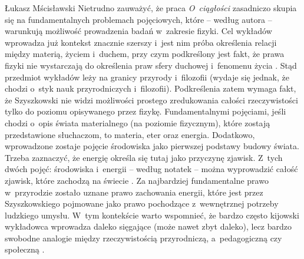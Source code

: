 \begin{artplenv}{Łukasz Mścisławski}
Nietrudno zauważyć, że praca \textit{O~ciągłości} zasadniczo skupia się na fundamentalnych problemach pojęciowych, które -- według autora -- warunkują możliwość prowadzenia badań w~zakresie fizyki. Cel wykładów wprowadza już kontekst znacznie szerszy i~jest nim próba określenia relacji między materią, życiem i~duchem, przy czym podkreślony jest fakt, że prawa fizyki nie wystarczają do określenia praw sfery duchowej i~fenomenu życia
\parencite*[][k. 211r]{noauthor_noty_1917}. %
 Stąd przedmiot wykładów leży na granicy przyrody i~filozofii (wydaje się jednak, że chodzi o~styk nauk przyrodniczych i~filozofii). Podkreślenia zatem wymaga fakt, że Szyszkowski nie widzi możliwości prostego zredukowania całości rzeczywistości tylko do poziomu opisywanego przez fizykę. Fundamentalnymi pojęciami, jeśli chodzi o~opis świata materialnego (na poziomie fizycznym), które zostają przedstawione słuchaczom, to materia, eter oraz energia. Dodatkowo, wprowadzone zostaje pojęcie środowiska jako pierwszej podstawy budowy świata. Trzeba zaznaczyć, że energię określa się tutaj jako przyczynę zjawisk. Z~tych dwóch pojęć: środowiska i~energii -- według notatek -- można wyprowadzić całość zjawisk, które zachodzą na świecie 
\parencite*[][k. 211v]{noauthor_noty_1917}. %
 Za najbardziej fundamentalne prawo w~przyrodzie zostało uznane prawo zachowania energii, które jest przez Szyszkowskiego pojmowane jako prawo pochodzące z~wewnętrznej potrzeby ludzkiego umysłu. W~tym kontekście warto wspomnieć, że bardzo często kijowski wykładowca wprowadza daleko sięgające (może nawet zbyt daleko), lecz bardzo swobodne analogie między rzeczywistością przyrodniczą, a~pedagogiczną czy społeczną 
\parencite[por. ][k. 211v]{noauthor_noty_1917}.%



\end{artplenv}
